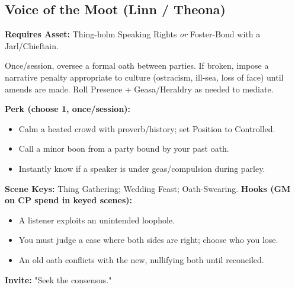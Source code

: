 \subsection{Voice of the Moot (Linn / Theona)}
\textbf{Requires Asset:} Thing-holm Speaking Rights \emph{or} Foster-Bond with a Jarl/Chieftain.
\begin{tcolorbox}[enhanced,sharp corners,boxrule=.6pt,title={Talent — Word-Bond (6 XP)}]
Once/session, oversee a formal oath between parties. If broken, impose a narrative penalty appropriate to culture (ostracism, ill-sea, loss of face) until amends are made. Roll Presence + Geasa/Heraldry as needed to mediate.
\end{tcolorbox}
\textbf{Perk (choose 1, once/session):}
\begin{itemize}
  \item Calm a heated crowd with proverb/history; set Position to Controlled.
  \item Call a minor boon from a party bound by your past oath.
  \item Instantly know if a speaker is under geas/compulsion during parley.
\end{itemize}
\textbf{Scene Keys:} Thing Gathering; Wedding Feast; Oath-Swearing.
\textbf{Hooks (GM on CP spend in keyed scenes):}
\begin{itemize}
  \item A listener exploits an unintended loophole.
  \item You must judge a case where both sides are right; choose who you lose.
  \item An old oath conflicts with the new, nullifying both until reconciled.
\end{itemize}
\textbf{Invite:} "Seek the consensus."

